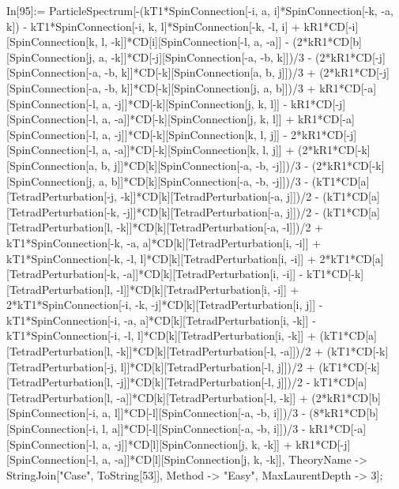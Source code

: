 In[95]:= ParticleSpectrum[-(kT1*SpinConnection[-i, a, i]*SpinConnection[-k, -a, k]) - kT1*SpinConnection[-i, k, l]*SpinConnection[-k, -l, i] + kR1*CD[-i][SpinConnection[k, l, -k]]*CD[i][SpinConnection[-l, a, -a]] - (2*kR1*CD[b][SpinConnection[j, a, -k]]*CD[-j][SpinConnection[-a, -b, k]])/3 - (2*kR1*CD[-j][SpinConnection[-a, -b, k]]*CD[-k][SpinConnection[a, b, j]])/3 + (2*kR1*CD[-j][SpinConnection[-a, -b, k]]*CD[-k][SpinConnection[j, a, b]])/3 + kR1*CD[-a][SpinConnection[-l, a, -j]]*CD[-k][SpinConnection[j, k, l]] - kR1*CD[-j][SpinConnection[-l, a, -a]]*CD[-k][SpinConnection[j, k, l]] + kR1*CD[-a][SpinConnection[-l, a, -j]]*CD[-k][SpinConnection[k, l, j]] - 2*kR1*CD[-j][SpinConnection[-l, a, -a]]*CD[-k][SpinConnection[k, l, j]] + (2*kR1*CD[-k][SpinConnection[a, b, j]]*CD[k][SpinConnection[-a, -b, -j]])/3 - (2*kR1*CD[-k][SpinConnection[j, a, b]]*CD[k][SpinConnection[-a, -b, -j]])/3 - (kT1*CD[a][TetradPerturbation[-j, -k]]*CD[k][TetradPerturbation[-a, j]])/2 - (kT1*CD[a][TetradPerturbation[-k, -j]]*CD[k][TetradPerturbation[-a, j]])/2 - (kT1*CD[a][TetradPerturbation[l, -k]]*CD[k][TetradPerturbation[-a, -l]])/2 + kT1*SpinConnection[-k, -a, a]*CD[k][TetradPerturbation[i, -i]] + kT1*SpinConnection[-k, -l, l]*CD[k][TetradPerturbation[i, -i]] + 2*kT1*CD[a][TetradPerturbation[-k, -a]]*CD[k][TetradPerturbation[i, -i]] - kT1*CD[-k][TetradPerturbation[l, -l]]*CD[k][TetradPerturbation[i, -i]] + 2*kT1*SpinConnection[-i, -k, -j]*CD[k][TetradPerturbation[i, j]] - kT1*SpinConnection[-i, -a, a]*CD[k][TetradPerturbation[i, -k]] - kT1*SpinConnection[-i, -l, l]*CD[k][TetradPerturbation[i, -k]] + (kT1*CD[a][TetradPerturbation[l, -k]]*CD[k][TetradPerturbation[-l, -a]])/2 + (kT1*CD[-k][TetradPerturbation[-j, l]]*CD[k][TetradPerturbation[-l, j]])/2 + (kT1*CD[-k][TetradPerturbation[l, -j]]*CD[k][TetradPerturbation[-l, j]])/2 - kT1*CD[a][TetradPerturbation[l, -a]]*CD[k][TetradPerturbation[-l, -k]] + (2*kR1*CD[b][SpinConnection[-i, a, l]]*CD[-l][SpinConnection[-a, -b, i]])/3 - (8*kR1*CD[b][SpinConnection[-i, l, a]]*CD[-l][SpinConnection[-a, -b, i]])/3 - kR1*CD[-a][SpinConnection[-l, a, -j]]*CD[l][SpinConnection[j, k, -k]] + kR1*CD[-j][SpinConnection[-l, a, -a]]*CD[l][SpinConnection[j, k, -k]], TheoryName -> StringJoin["Case", ToString[53]], Method -> "Easy", MaxLaurentDepth -> 3]; 